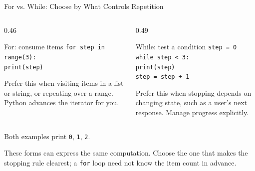 \documentclass[aspectratio=169,10pt]{beamer}
\begin{document}
\begin{frame}[t]{For vs. While: Choose by What Controls Repetition}
  \small
  \begin{columns}[T,onlytextwidth]
    \begin{column}{0.46\textwidth}
      \begin{block}{For: consume items}
        \texttt{for step in range(3):}\\
        \hspace{0.18in}\texttt{print(step)}
      \end{block}
      Prefer this when visiting items in a list or string, or repeating over a range. Python advances the iterator for you.
    \end{column}
    \begin{column}{0.49\textwidth}
      \begin{block}{While: test a condition}
        \texttt{step = 0}\\
        \texttt{while step < 3:}\\
        \hspace{0.18in}\texttt{print(step)}\\
        \hspace{0.18in}\texttt{step = step + 1}
      \end{block}
      Prefer this when stopping depends on changing state, such as a user's next response. Manage progress explicitly.
    \end{column}
  \end{columns}
  Both examples print \texttt{0}, \texttt{1}, \texttt{2}.
  \begin{keyidea}
    These forms can express the same computation. Choose the one that makes the stopping rule clearest; a \texttt{for} loop need not know the item count in advance.
  \end{keyidea}
\end{frame}
\end{document}
